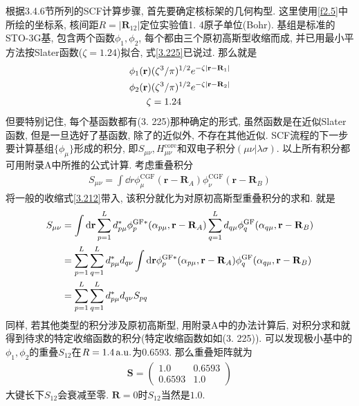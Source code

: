根据3.4.6节所列的SCF计算步骤, 
首先要确定核标架的几何构型. 
这里使用\ref{f2.5}中所绘的坐标系, 
核间距$R=|\mathbf{R}_{12}|$定位实验值1.
4原子单位(Bohr). 
基组是标准的STO-3G基, 
包含两个函数$\phi_1,\phi_2$, 
每个都由三个原初高斯型收缩而成, 
并已用最小平方法按Slater函数($\zeta=1.24$)拟合, 
式\eqref{3.225}已说过. 
那么就是
\begin{equation}
	\begin{split}
		\phi_1(\mathbf{r}) & (\zeta^3/\pi)^{1/2}e^{-\zeta|\mathbf{r-R}_1|}\\
		\phi_2(\mathbf{r}) & (\zeta^3/\pi)^{1/2}e^{-\zeta|\mathbf{r-R}_2|}\\
		\zeta & = 1.24
	\end{split}
\end{equation}
但要特别记住,
每个基函数都有(3.
225)那种确定的形式, 
虽然函数是在近似Slater函数, 
但是一旦选好了基函数, 
除了\hft 的近似外, 
不存在其他近似. 
SCF流程的下一步要计算基组$\{\phi_\mu\}$形成的积分, 
即$S_{\mu\nu}, H_{\mu\nu}^\mathrm{core}$和双电子积分$(\mu\nu|\lambda\sigma)$. 
以上所有积分都可用附录A中所推的公式计算. 
考虑重叠积分
\begin{align}
	S_{\mu\nu} = \int\dd{r}\phi_\mu^\mathrm{CGF}(\mathbf{r-R}_A)\phi_\nu^\mathrm{CGF}(\mathbf{r-R}_B)
\end{align}
将一般的收缩式\eqref{3.212}带入, 
该积分就化为对原初高斯型重叠积分的求和. 
就是
\begin{align}
	S_{\mu\nu} & = \int\dd{r}\sum_{p=1}^{L}d_{p\mu}^*\phi_p^\mathrm{GF*}(\alpha_{p\mu},\mathbf{r-R}_A)\sum_{q=1}^{L}d_{q\mu}\phi_q^\mathrm{GF}(\alpha_{q\mu},\mathbf{r-R}_B)\notag\\
	& = \sum_{p=1}^{L}\sum_{q=1}^{L} d_{p\mu}^*d_{q\nu}\int\dd{r}\phi_p^\mathrm{GF*}(\alpha_{p\mu},\mathbf{r-R}_A)\phi_q^\mathrm{GF}(\alpha_{q\mu},\mathbf{r-R}_B)\notag\\
	& = \sum_{p=1}^{L}\sum_{q=1}^{L}d^*_{p\mu}d_{q\nu}S_{pq}
\end{align}
同样, 
若其他类型的积分涉及原初高斯型, 
用附录A中的办法计算后, 
对积分求和就得到待求的特定收缩函数的积分(特定收缩函数如如(3.
225)). 
可以发现极小基中的$\phi_1,\phi_2$的重叠$S_{12}$在$R=1.4\,\mathrm{a.u.}$为$0.6593$. 
那么重叠矩阵就为
\begin{align}
	\mathbf{S} = 
	\begin{pmatrix}
		1.0 & 0.6593\\0.6593 & 1.0
	\end{pmatrix}
\end{align}
大键长下$S_{12}$会衰减至零. 
$\mathbf{R}=0$时$S_{12}$当然是$1.0$.

